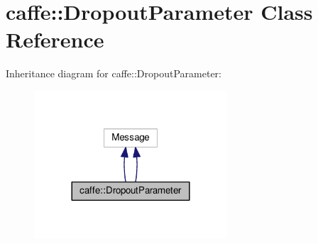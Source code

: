 \hypertarget{classcaffe_1_1_dropout_parameter}{}\section{caffe\+:\+:Dropout\+Parameter Class Reference}
\label{classcaffe_1_1_dropout_parameter}


Inheritance diagram for caffe\+:\+:Dropout\+Parameter\+:
\nopagebreak
\begin{figure}[H]
\begin{center}
\leavevmode
\includegraphics[width=204pt]{classcaffe_1_1_dropout_parameter__inherit__graph}
\end{center}
\end{figure}
